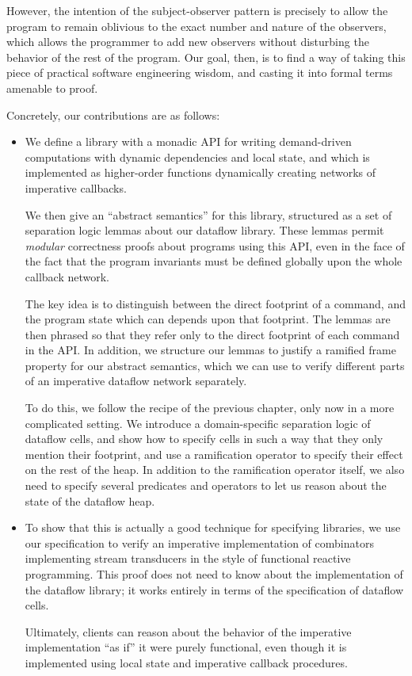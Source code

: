 However, the intention of the subject-observer pattern is precisely to
allow the program to remain oblivious to the exact number and nature
of the observers, which allows the programmer to add new observers
without disturbing the behavior of the rest of the program.  Our goal,
then, is to find a way of taking this piece of practical software
engineering wisdom, and casting it into formal terms amenable to
proof.

Concretely, our contributions are as follows: 

\begin{itemize}
  \item We define a library with a monadic API for writing
    demand-driven computations with dynamic dependencies and local
    state, and which is implemented as higher-order functions
    dynamically creating networks of imperative callbacks.

    We then give an ``abstract semantics'' for this
    library, structured as a set of separation logic lemmas about our
    dataflow library. These lemmas permit \emph{modular} correctness
    proofs about programs using this API, even in the face of the fact
    that the program invariants must be defined globally upon the
    whole callback network.

    The key idea is to distinguish between the direct footprint of a
    command, and the program state which can depends upon that
    footprint. The lemmas are then phrased so that they refer only to
    the direct footprint of each command in the API. In addition, we
    structure our lemmas to justify a ramified frame property for our
    abstract semantics, which we can use to verify different parts of
    an imperative dataflow network separately.

    To do this, we follow the recipe of the previous chapter, only now
    in a more complicated setting. We introduce a domain-specific
    separation logic of dataflow cells, and show how to specify cells
    in such a way that they only mention their footprint, and use a
    ramification operator to specify their effect on the rest of the
    heap. In addition to the ramification operator itself, we also
    need to specify several predicates and operators to let us reason
    about the state of the dataflow heap.

  \item To show that this is actually a good technique for specifying
    libraries, we use our specification to verify an imperative
    implementation of combinators implementing stream transducers in
    the style of functional reactive programming. This proof does not
    need to know about the implementation of the dataflow library; it
    works entirely in terms of the specification of dataflow cells.

    Ultimately, clients can reason about the behavior of the
    imperative implementation ``as if'' it were purely functional,
    even though it is implemented using local state and imperative
    callback procedures.
\end{itemize}


